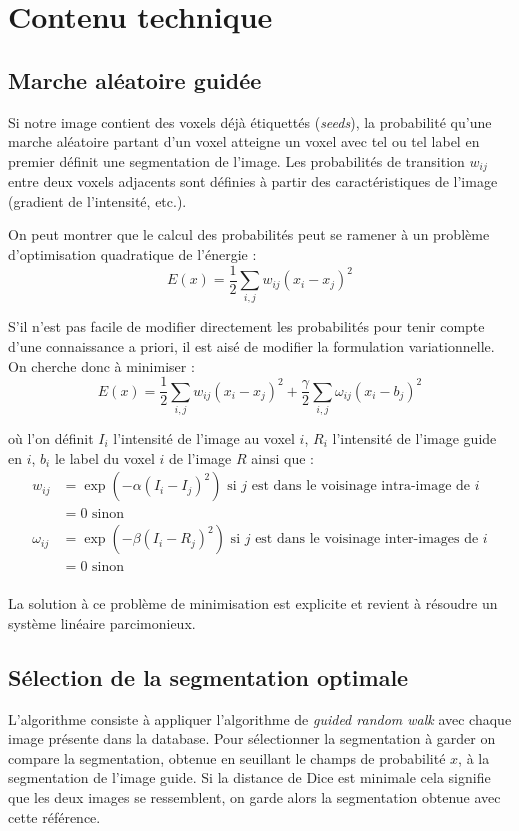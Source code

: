 \documentclass{article}
\begin{document}
\section{Contenu technique}

\subsection{Marche aléatoire guidée}

Si notre image contient des voxels déjà étiquettés (\textit{seeds}), la probabilité qu'une marche aléatoire partant d'un voxel atteigne un voxel avec tel ou tel label en premier définit une segmentation de l'image. Les probabilités de transition $w_{ij}$ entre deux voxels adjacents sont définies à partir des caractéristiques de l'image (gradient de l'intensité, etc.).

On peut montrer que le calcul des probabilités peut se ramener à un problème d'optimisation quadratique de l'énergie : 
$$ E(x)= \frac{1}{2} \sum_{i,j}{w_{ij} (x_i -x_j)^2} $$

S'il n'est pas facile de modifier directement les probabilités pour tenir compte d'une connaissance a priori, il est aisé de modifier la formulation variationnelle. On cherche donc à minimiser :
$$ E(x)= \frac{1}{2} \sum_{i,j}{w_{ij} (x_i -x_j)^2} + \frac{\gamma}{2} \sum_{i,j}{\omega_{ij} (x_i -b_j)^2}$$

où l'on définit $I_i$ l'intensité de l'image au voxel $i$, $R_i$ l'intensité de l'image guide en $i$, $b_i$ le label du voxel $i$ de l'image $R$ ainsi que :
\begin{align*}
  w_{ij} &= \exp(-\alpha(I_i-I_j)^2) \text{ si $j$ est dans le voisinage intra-image de $i$} \\
  &= 0 \text{ sinon}\\
  \omega_{ij} &= \exp(-\beta(I_i-R_j)^2) \text{ si $j$ est dans le voisinage inter-images de $i$}\\
  &= 0 \text{ sinon}\\
\end{align*}

La solution à ce problème de minimisation est explicite et revient à résoudre un système linéaire parcimonieux.

\subsection{Sélection de la segmentation optimale}

L'algorithme consiste à appliquer l'algorithme de \textit{guided random walk} avec chaque image présente dans la database. Pour sélectionner la segmentation à garder on compare la segmentation, obtenue en seuillant le champs de probabilité $x$, à la segmentation de l'image guide. Si la distance de Dice est minimale cela signifie que les deux images se ressemblent, on garde alors la segmentation obtenue avec cette référence.
\end{document}
